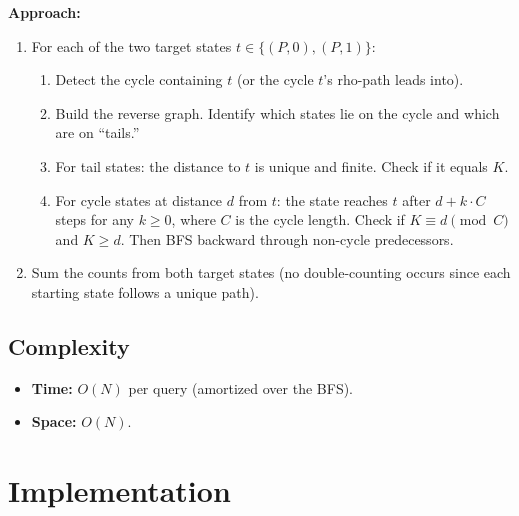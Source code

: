 \documentclass[11pt,a4paper]{article}
\begin{document}
\textbf{Approach:}
\begin{enumerate}
    \item For each of the two target states $t \in \{(P,0), (P,1)\}$:
    \begin{enumerate}
        \item Detect the cycle containing $t$ (or the cycle $t$'s rho-path leads into).
        \item Build the reverse graph. Identify which states lie on the cycle and which are on ``tails.''
        \item For tail states: the distance to $t$ is unique and finite. Check if it equals $K$.
        \item For cycle states at distance $d$ from $t$: the state reaches $t$ after $d + k \cdot C$ steps for any $k \ge 0$, where $C$ is the cycle length. Check if $K \equiv d \pmod{C}$ and $K \ge d$. Then BFS backward through non-cycle predecessors.
    \end{enumerate}
    \item Sum the counts from both target states (no double-counting occurs since each starting state follows a unique path).
\end{enumerate}

\subsection{Complexity}
\begin{itemize}
    \item \textbf{Time:} $O(N)$ per query (amortized over the BFS).
    \item \textbf{Space:} $O(N)$.
\end{itemize}

\section{Implementation}
\end{document}
